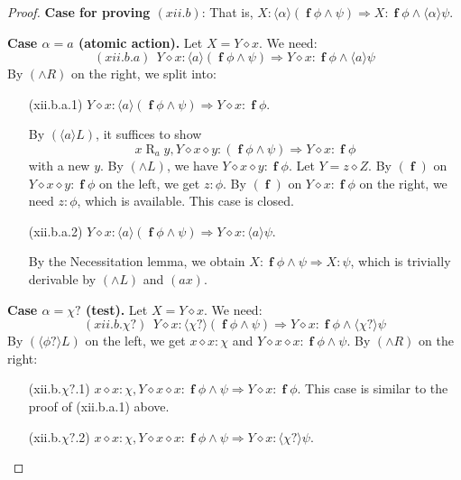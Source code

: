 \documentclass[manuscript,screen]{acmart}
\newcommand{\la}[0]{\langle}
\newcommand{\ra}[0]{\rangle}
\newcommand{\cat}[0]{\diamond}
\DeclareMathOperator{\ofst}{\mathbf{f}}
\DeclareMathOperator{\R}{R}
\begin{document}
\begin{proof}
\textbf{Case for proving $(xii.b)$}: 
That is, $X : \la\alpha\ra(\ofst\phi\wedge \psi)\Rightarrow X : \ofst \phi\wedge \la\alpha\ra\psi$. 

\textbf{Case $\alpha = a$ (atomic action).} Let $X = Y\cat x$. We need:
$$
(xii.b.a)\ \ Y\cat x : \la a\ra(\ofst\phi\wedge\psi)\Rightarrow Y\cat x : \ofst\phi\wedge \la a\ra\psi
$$
By $(\wedge R)$ on the right, we split into:
\begin{enumerate}
    \item[(xii.b.a.1)] $Y\cat x : \la a\ra(\ofst\phi\wedge\psi)\Rightarrow Y\cat x : \ofst\phi$. 
    
    By $(\la a\ra L)$, it suffices to show $$x\R_a y, Y\cat x\cat y : (\ofst\phi\wedge\psi)\Rightarrow Y\cat x : \ofst\phi$$ with a new $y$. 
    By $(\wedge L)$, we have $Y\cat x\cat y : \ofst\phi$. Let $Y = z\cat Z$. By $(\ofst)$ on $Y\cat x\cat y : \ofst\phi$ on the left, we get $z : \phi$. By $(\ofst)$ on $Y\cat x : \ofst\phi$ on the right, we need $z : \phi$, which is available. This case is closed.
    
    \item[(xii.b.a.2)] $Y\cat x : \la a\ra(\ofst\phi\wedge\psi)\Rightarrow Y\cat x : \la a\ra\psi$. 
    
By the Necessitation lemma, we obtain $X : \ofst\phi\wedge\psi\Rightarrow X : \psi$, which is trivially derivable by $(\wedge L)$ and $(\textit{ax})$. 
\end{enumerate}

\textbf{Case $\alpha = \chi?$ (test).} Let $X = Y\cat x$. We need:
$$
(xii.b.\chi?)\ \ Y\cat x : \la\chi?\ra(\ofst\phi\wedge\psi)\Rightarrow Y\cat x : \ofst\phi\wedge \la\chi?\ra\psi
$$
By $(\la\phi?\ra L)$ on the left, we get $x\cat x : \chi$ and $Y\cat x\cat x : \ofst\phi\wedge\psi$. By $(\wedge R)$ on the right:
\begin{enumerate}
    \item[(xii.b.$\chi?$.1)] $x\cat x : \chi, Y\cat x\cat x : \ofst\phi\wedge\psi\Rightarrow Y\cat x : \ofst\phi$. This case is similar to the proof of (xii.b.a.1) above. 
    
    
    \item[(xii.b.$\chi?$.2)] $x\cat x : \chi, Y\cat x\cat x : \ofst\phi\wedge\psi\Rightarrow Y\cat x : \la\chi?\ra\psi$.
    

\end{enumerate}
\end{proof}
\end{document}
